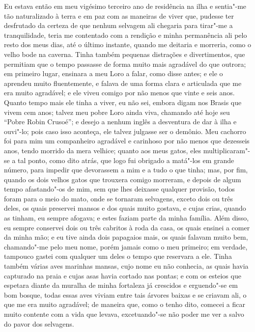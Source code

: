 Eu estava então em meu vigésimo terceiro ano de residência na ilha e
sentia"-me tão naturalizado à terra e em paz com as maneiras de viver
que, pudesse ter desfrutado da certeza de que nenhum selvagem ali
chegaria para tirar"-me a tranquilidade, teria me contentado com a
rendição e minha permanência ali pelo resto dos meus dias, até o último
instante, quando me deitaria e morreria, como o velho bode na caverna.
Tinha também pequenas distrações e divertimentos, que permitiam que o
tempo passasse de forma muito mais agradável do que outrora; em primeiro
lugar, ensinara a meu Loro a falar, como disse antes; e ele o aprendeu
muito fluentemente, e falava de uma forma clara e articulada que me era
muito agradável; e ele viveu comigo por não menos que vinte e seis anos.
Quanto tempo mais ele tinha a viver, eu não sei, embora digam nos Brasis
que vivem cem anos; talvez meu pobre Loro ainda viva, chamando até hoje
seu ``Pobre Robin Crusoé''; e desejo a nenhum inglês a desventura de dar
à ilha e ouvi"-lo; pois caso isso aconteça, ele talvez julgasse ser o
demônio. Meu cachorro foi para mim um companheiro agradável e carinhoso
por não menos que dezesseis anos, tendo morrido da mera velhice; quanto
aos meus gatos, eles multiplicaram"-se a tal ponto, como dito atrás, que
logo fui obrigado a matá"-los em grande número, para impedir que
devorassem a mim e a tudo o que tinha; mas, por fim, quando os dois
velhos gatos que trouxera comigo morreram, e depois de algum tempo
afastando"-os de mim, sem que lhes deixasse qualquer provisão, todos
foram para o meio do mato, onde se tornaram selvagens, exceto dois ou
três deles, os quais preservei mansos e dos quais muito gostava, e cujas
crias, quando as tinham, eu sempre afogava; e estes faziam parte da
minha família. Além disso, eu sempre conservei dois ou três cabritos à
roda da casa, os quais ensinei a comer da minha mão; e eu tive ainda
dois papagaios mais, os quais falavam muito bem, chamando"-me pelo meu
nome, porém jamais como o meu primeiro; em verdade, tampouco gastei com
qualquer um deles o tempo que reservara a ele. Tinha também várias aves
marinhas mansas, cujo nome eu não conhecia, as quais havia capturado na
praia e cujas asas havia cortado nas pontas; e com os esteios que
espetara diante da muralha de minha fortaleza já crescidos e erguendo"-se
em bom bosque, todas essas aves viviam entre tais árvores baixas e se
criavam ali, o que me era muito agradável; de maneira que, como o tenho
dito, comecei a ficar muito contente com a vida que levava,
excetuando"-se não poder me ver a salvo do pavor dos selvagens.

